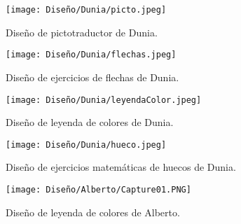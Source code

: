\begin{figure}[ht!]
  \centering
  \texttt{[image: Diseño/Dunia/picto.jpeg]}
  \caption{Diseño de pictotraductor de Dunia.}
  \label{dunia3}
\end{figure}

\begin{figure}[ht!]
  \centering
  \texttt{[image: Diseño/Dunia/flechas.jpeg]}
  \caption{Diseño de ejercicios de flechas de Dunia.}
  \label{dunia4}
\end{figure}

\begin{figure}[ht!]
  \centering
  \texttt{[image: Diseño/Dunia/leyendaColor.jpeg]}
  \caption{Diseño de leyenda de colores de Dunia.}
  \label{dunia5}
\end{figure}

\begin{figure}[ht!]
  \centering
  \texttt{[image: Diseño/Dunia/hueco.jpeg]}
  \caption{Diseño de ejercicios matemáticas de huecos de Dunia.}
  \label{dunia6}
\end{figure}

\begin{figure}[ht!]
  \centering
  \texttt{[image: Diseño/Alberto/Capture01.PNG]}
  \caption{Diseño de leyenda de colores de Alberto.}


\end{figure}

